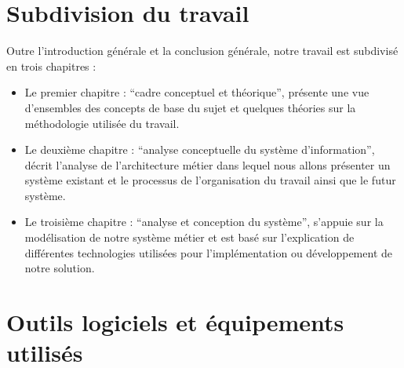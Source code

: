     \section[Subdivision du travail]{Subdivision du travail}
    Outre l’introduction générale et la conclusion générale, notre travail est subdivisé
    en trois chapitres :
    \newline
        \begin{itemize}
            \item [\ding{226}] Le premier chapitre : \enquote{cadre conceptuel et théorique}, présente une vue
            d’ensembles des concepts de base du sujet et quelques théories sur la méthodologie
            utilisée du travail.
            \newline
            \item [\ding{226}] Le deuxième chapitre : \enquote{analyse conceptuelle du système d’information}, 
            décrit l’analyse de l’architecture métier dans lequel nous allons présenter un système existant
            et le processus de l’organisation du travail ainsi que le futur système.
            \newline       
            \item [\ding{226}] Le troisième chapitre : \enquote{analyse et conception du système}, s’appuie sur la
            modélisation de notre système métier et est basé sur l’explication de différentes
            technologies utilisées pour l’implémentation ou développement de notre solution.            
        \end{itemize} 
    \section[Outils logiciels et équipements utilisés]{Outils logiciels et équipements utilisés}
